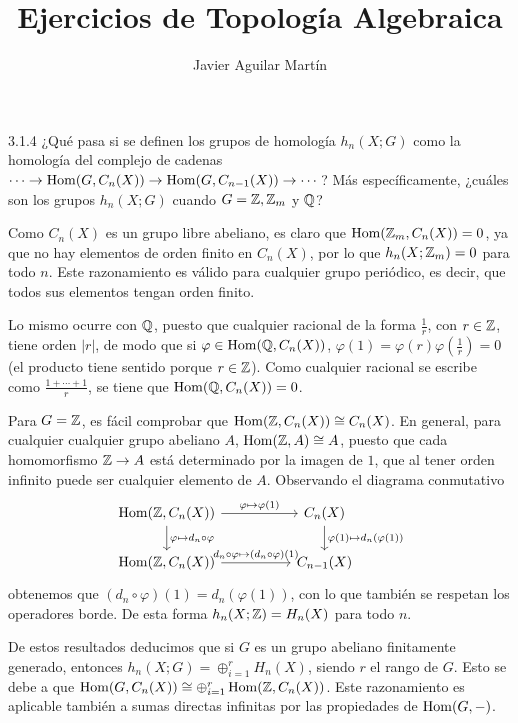 \documentclass[twoside]{article}
\begin{document}
\title{Ejercicios de Topología Algebraica}
\author{Javier Aguilar Martín}
\maketitle

\begin{ejercicio}{3.1.4}
¿Qué pasa si se definen los grupos de homología $h_n(X;G)$ como la homología del complejo de cadenas $\cdots\to\operatorname{Hom}(G,C_n(X))\to\operatorname{Hom}(G,C_{n-1}(X))\to\cdots$? Más específicamente, ¿cuáles son los grupos $h_n(X;G)$ cuando $G=\mathbb{Z},\mathbb{Z}_m$ y $\mathbb{Q}$?
\end{ejercicio}
\begin{solucion}
Como $C_n(X)$ es un grupo libre abeliano, es claro que $\operatorname{Hom}(\mathbb{Z}_m,C_n(X))=0$, ya que no hay elementos de orden finito en $C_n(X)$, por lo que $h_n(X;\mathbb{Z}_m)=0$ para todo $n$. Este razonamiento es válido para cualquier grupo periódico, es decir, que todos sus elementos tengan orden finito.

 Lo mismo ocurre con $\mathbb{Q}$, puesto que cualquier racional de la forma $\frac{1}{r}$, con $r\in\mathbb{Z}$, tiene orden $|r|$, de modo que si $\varphi\in\operatorname{Hom}(\mathbb{Q},C_n(X))$, $\varphi(1)=\varphi(r)\varphi\left(\frac{1}{r}\right)=0$ (el producto tiene sentido porque $r\in\mathbb{Z}$). Como cualquier racional se escribe como $\frac{1+\cdots+1}{r}$, se tiene que $\operatorname{Hom}(\mathbb{Q},C_n(X))=0$.

Para $G=\mathbb{Z}$, es fácil comprobar que $\operatorname{Hom}(\mathbb{Z},C_n(X))\cong C_n(X)$. En general, para cualquier cualquier grupo abeliano $A$, $\operatorname{Hom}(\mathbb{Z},A)\cong A$, puesto que cada homomorfismo $\mathbb{Z}\to A$ está determinado por la imagen de $1$, que al tener orden infinito puede ser cualquier elemento de $A$. Observando el diagrama conmutativo
\[
\begin{tikzcd}[column sep=50]
\Hom(\Z,C_n(X))\arrow[r, "\varphi\mapsto \varphi(1)"]\arrow[d, "\varphi\mapsto d_n\circ \varphi"] & C_n(X)\arrow[d, "\varphi(1)\mapsto d_n(\varphi(1))"]\\
\Hom(\Z,C_n(X))\arrow[r, "d_n\circ\varphi\mapsto (d_n\circ\varphi)(1)"] & C_{n-1}(X)
\end{tikzcd}
\]
obtenemos que $(d_n\circ\varphi)(1)=d_n(\varphi(1))$, con lo que también se respetan los operadores borde. De esta forma $h_n(X;\mathbb{Z})=H_n(X)$ para todo $n$. 


De estos resultados deducimos que si $G$ es un grupo abeliano finitamente generado, entonces $h_n(X;G)=\oplus_{i=1}^rH_n(X)$, siendo $r$ el rango de $G$. Esto se debe a que $\operatorname{Hom}(G,C_n(X))\cong\oplus_{i=1}^r\operatorname{Hom}(\mathbb{Z},C_n(X))$. Este razonamiento es aplicable también a sumas directas infinitas por las propiedades de $\operatorname{Hom}(G,-)$. 



\end{solucion}
\end{document}
